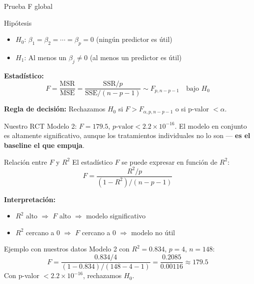 \documentclass[aspectratio=169, 11pt]{beamer}
\begin{document}
\begin{frame}{Prueba F global}
\begin{block}{Hipótesis}
\begin{itemize}
  \item $H_0$: $\beta_1 = \beta_2 = \cdots = \beta_p = 0$ (ningún predictor es útil)
  \item $H_1$: Al menos un $\beta_j \neq 0$ (al menos un predictor es útil)
\end{itemize}
\end{block}

\vspace{0.2cm}
\textbf{Estadístico:}
\[
F = \frac{\text{MSR}}{\text{MSE}} = \frac{\text{SSR}/p}{\text{SSE}/(n - p - 1)} \sim F_{p, n-p-1} \quad \text{bajo } H_0
\]

\vspace{0.2cm}
\textbf{Regla de decisión:}
Rechazamos $H_0$ si $F > F_{\alpha, p, n-p-1}$ o si p-valor $< \alpha$.

\vspace{0.2cm}
\begin{exampleblock}{Nuestro RCT}
Modelo 2: $F = 179.5$, $p\text{-valor} < 2.2 \times 10^{-16}$. El modelo en conjunto es altamente significativo, aunque los tratamientos individuales no lo son --- \textbf{es el baseline el que empuja}.
\end{exampleblock}
\end{frame}

\begin{frame}{Relación entre $F$ y $R^2$}
El estadístico $F$ se puede expresar en función de $R^2$:
\[
F = \frac{R^2 / p}{(1 - R^2)/(n - p - 1)}
\]

\vspace{0.2cm}
\textbf{Interpretación:}
\begin{itemize}
  \item $R^2$ alto $\Rightarrow$ $F$ alto $\Rightarrow$ modelo significativo
  \item $R^2$ cercano a 0 $\Rightarrow$ $F$ cercano a 0 $\Rightarrow$ modelo no útil
\end{itemize}

\vspace{0.3cm}
\begin{exampleblock}{Ejemplo con nuestros datos}
Modelo 2 con $R^2 = 0.834$, $p = 4$, $n = 148$:
\[
F = \frac{0.834 / 4}{(1 - 0.834) / (148 - 4 - 1)} = \frac{0.2085}{0.00116} \approx 179.5
\]
Con p-valor $< 2.2 \times 10^{-16}$, rechazamos $H_0$.
\end{exampleblock}
\end{frame}
\end{document}
